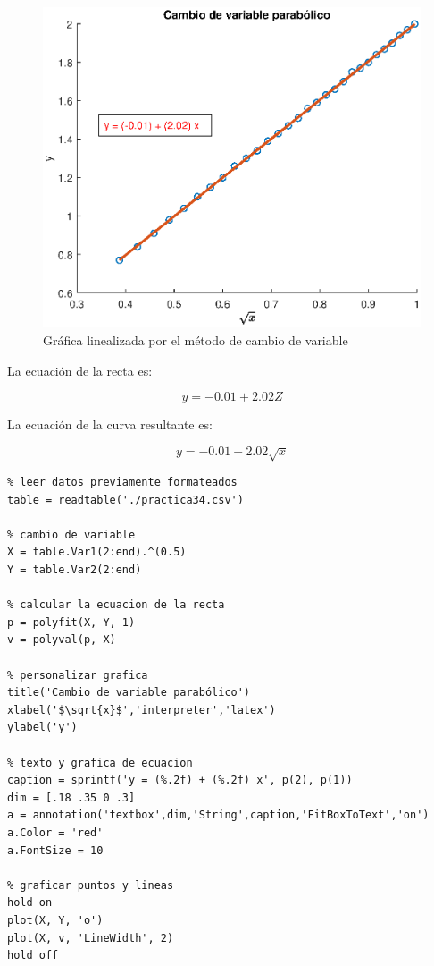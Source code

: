 \documentclass[letter,11pt]{article}
\begin{document}
\begin{figure}[!h]
\centering
\includegraphics[scale=1.00]{eps/3.4.3.eps}
\caption{Gráfica linealizada por el método de cambio de variable}
\label{practica34_3}
\end{figure}

La ecuación de la recta es:

\begin{equation}
    y = -0.01 + 2.02 Z
\end{equation}

La ecuación de la curva resultante es:

\begin{equation}
    y = -0.01 + 2.02 \sqrt{x}
\end{equation}

\footnotesize
\begin{verbatim}
% leer datos previamente formateados
table = readtable('./practica34.csv')

% cambio de variable
X = table.Var1(2:end).^(0.5)
Y = table.Var2(2:end)

% calcular la ecuacion de la recta
p = polyfit(X, Y, 1)
v = polyval(p, X)

% personalizar grafica
title('Cambio de variable parabólico')
xlabel('$\sqrt{x}$','interpreter','latex')
ylabel('y')

% texto y grafica de ecuacion
caption = sprintf('y = (%.2f) + (%.2f) x', p(2), p(1))
dim = [.18 .35 0 .3]
a = annotation('textbox',dim,'String',caption,'FitBoxToText','on')
a.Color = 'red'
a.FontSize = 10

% graficar puntos y lineas
hold on
plot(X, Y, 'o')
plot(X, v, 'LineWidth', 2)
hold off
\end{verbatim}
\normalsize
\end{document}
